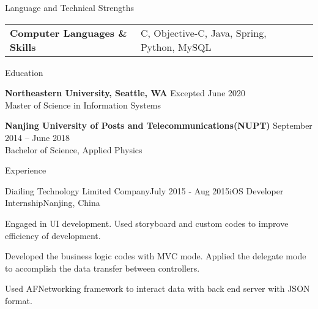 \documentclass{resume} %
\begin{document}
\begin{rSection}{Language and Technical Strengths}

\begin{tabu} to 
Computer Languages \& Skills & C, Objective-C, Java, Spring, Python, MySQL
\end{tabu}

\end{rSection}


\begin{rSection}{Education}

{\bf Northeastern University, Seattle, WA} \hfill {Excepted June 2020} \\
Master of Science in Information Systems 

{\bf Nanjing University of Posts and Telecommunications(NUPT)} \hfill {September 2014 -- June 2018} \\
Bachelor of Science, Applied Physics

\end{rSection}


\begin{rSection}{Experience}

\begin{rSubsection}{Diailing Technology Limited Company}{July 2015 - Aug 2015}{iOS Developer Internship}{Nanjing, China}
\item Engaged in UI development. Used storyboard and custom codes to improve efficiency of development.
\item Developed the business logic codes with MVC mode. Applied the delegate mode to accomplish the data transfer between controllers.
\item Used AFNetworking framework to interact data with back end server with JSON format.
\end{rSubsection}

\end{rSection}

\end{document}

